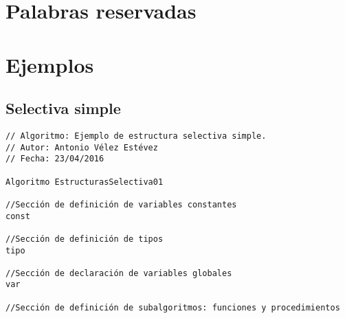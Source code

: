 \documentclass{article}
\begin{document}
\begin{appendices}

  \section{Palabras reservadas}


  \pagebreak

  \section{Ejemplos}

  \subsection{Selectiva simple}

  \begin{lstlisting}[language = pseudocodigoesp]
// Algoritmo: Ejemplo de estructura selectiva simple.
// Autor: Antonio Vélez Estévez
// Fecha: 23/04/2016
 
Algoritmo EstructurasSelectiva01

//Sección de definición de variables constantes
const 
	
//Sección de definición de tipos
tipo

//Sección de declaración de variables globales	
var

//Sección de definición de subalgoritmos: funciones y procedimientos	


\end{lstlisting}
\end{appendices}
\end{document}
